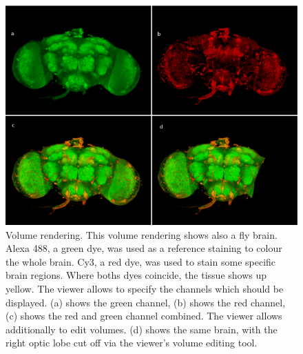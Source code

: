 \documentclass[a4paper,10pt]{article}
\begin{document}
\begin{figure}[m]
\centering
\includegraphics[width=\textwidth]{images/volume_montage}
\caption {Volume rendering. This volume rendering shows also a fly brain. Alexa 488, a green dye, was used as a reference staining to colour the whole brain. Cy3, a red dye, was used to stain some specific brain regions. Where boths dyes coincide, the tissue shows up yellow. The viewer allows to specify the channels which should be displayed. (a) shows the green channel, (b) shows the red channel, (c) shows the red and green channel combined. The viewer allows additionally to edit volumes. (d) shows the same brain, with the right optic lobe cut off via the viewer's volume editing tool.}
\label{fig:volume}
\end{figure}
\end{document}
